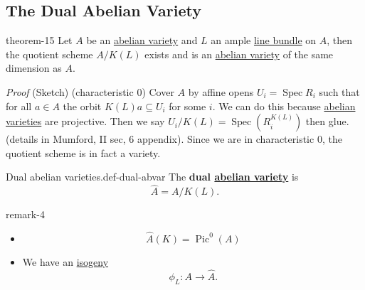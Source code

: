 \documentclass[10pt,]{book}
\makeatletter
\newcommand{\terminology}[1]{\textbf{#1}}
\renewcommand*{\proofname}{Proof}
\renewenvironment{proof}[1][\proofname]{\par
  \pushQED{\qed}%
  \normalfont \topsep6\p@\@plus6\p@\relax
  \trivlist
  \item\relax
    {\itshape
    #1\@addpunct{.}}\hspace\labelsep\ignorespaces
}{%
  \popQED\endtrivlist\@endpefalse
}
\numberwithin{equation}{section}
\DeclareMathOperator{\Pic}{Pic}
\DeclareMathOperator{\Spec}{Spec}
\makeatother
\begin{document}
\subsection[{The Dual Abelian Variety}]{The Dual Abelian Variety}\label{subsection-22}
\begin{theorem}{}{}{theorem-15}%
\hypertarget{p-190}{}%
Let \(A\) be an \hyperref[def-buntes-abvar]{abelian variety} and \(L\) an ample \hyperref[def-line-bundle]{line bundle} on \(A\), then the quotient scheme \(A/K(L)\) exists and is an \hyperref[def-buntes-abvar]{abelian variety} of the same dimension as \(A\).%
\end{theorem}
\begin{proof}\hypertarget{proof-37}{}
\hypertarget{p-191}{}%
(Sketch) (characteristic 0) Cover \(A\) by affine opens \(U_i = \Spec R_i\) such that for all \(a \in A\) the orbit \(K(L)a \subseteq U_i\) for some \(i\). We can do this because \hyperref[def-buntes-abvar]{abelian varieties} are projective. Then we say \(U_i / K(L) = \Spec(R^{K(L)}_i)\) then glue. (details in Mumford, II sec, 6  appendix). Since we are in characteristic 0, the quotient scheme is in fact a variety.%
\end{proof}
\begin{definition}{Dual abelian varieties.}{def-dual-abvar}%
\hypertarget{p-192}{}%
The \terminology{dual \hyperref[def-buntes-abvar]{abelian variety}} is%
\begin{equation*}
\hat A = A/K(L)\text{.}
\end{equation*}
%
\end{definition}
\begin{remark}{}{remark-4}%
\hypertarget{p-193}{}%
\leavevmode%
\begin{itemize}[label=\textbullet]
\item{}%
\begin{equation*}
\hat A(K) = \Pic^0(A)
\end{equation*}
%
\item{}We have an \hyperref[def-supersing-isog-isog]{isogeny}%
\begin{equation*}
\phi_L\colon A \to \hat A\text{.}
\end{equation*}
%
\end{itemize}
%
\end{remark}
\end{document}
